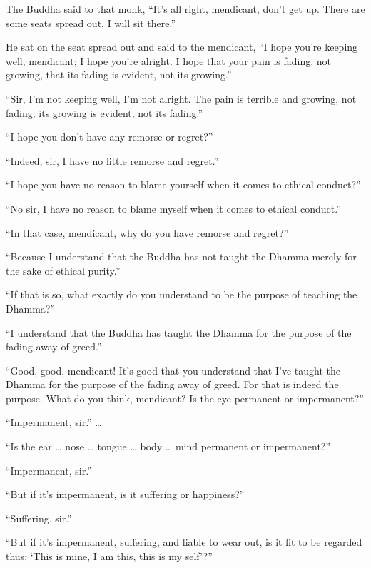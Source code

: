 \documentclass[12pt,openany]{book}%
\begin{document}
The Buddha said to that monk, “It’s all right, mendicant, don’t get up. There are some seats spread out, I will sit there.” 

He sat on the seat spread out and said to the mendicant, “I hope you’re keeping well, mendicant; I hope you’re alright. I hope that your pain is fading, not growing, that its fading is evident, not its growing.” 

“Sir, I’m not keeping well, I’m not alright. The pain is terrible and growing, not fading; its growing is evident, not its fading.” 

“I hope you don’t have any remorse or regret?” 

“Indeed, sir, I have no little remorse and regret.” 

“I hope you have no reason to blame yourself when it comes to ethical conduct?” 

“No sir, I have no reason to blame myself when it comes to ethical conduct.” 

“In that case, mendicant, why do you have remorse and regret?” 

“Because I understand that the Buddha has not taught the Dhamma merely for the sake of ethical purity.” 

“If that is so, what exactly do you understand to be the purpose of teaching the Dhamma?” 

“I understand that the Buddha has taught the Dhamma for the purpose of the fading away of greed.” 

“Good, good, mendicant! It’s good that you understand that I’ve taught the Dhamma for the purpose of the fading away of greed. For that is indeed the purpose. What do you think, mendicant? Is the eye permanent or impermanent?” 

“Impermanent, sir.” … 

“Is the ear … nose … tongue … body … mind permanent or impermanent?” 

“Impermanent, sir.” 

“But if it’s impermanent, is it suffering or happiness?” 

“Suffering, sir.” 

“But if it’s impermanent, suffering, and liable to wear out, is it fit to be regarded thus: ‘This is mine, I am this, this is my self’?” 
\end{document}
